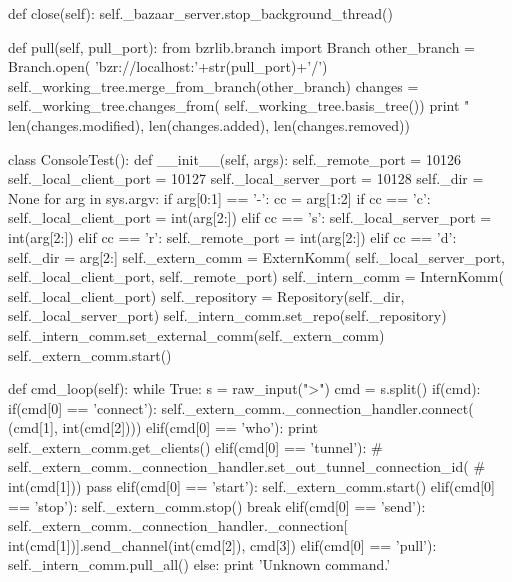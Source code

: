     def close(self):
        self._bazaar_server.stop_background_thread()

    def pull(self, pull_port):
        from bzrlib.branch import Branch
        other_branch = Branch.open(
            'bzr://localhost:'+str(pull_port)+'/')
        self._working_tree.merge_from_branch(other_branch)
        changes = self._working_tree.changes_from(
            self._working_tree.basis_tree())
        print "%
            len(changes.modified), len(changes.added), len(changes.removed))




class ConsoleTest():
    def __init__(self, args):
        self._remote_port       = 10126
        self._local_client_port = 10127
        self._local_server_port = 10128
        self._dir = None
        for arg in sys.argv:
            if arg[0:1] == '-':
                cc = arg[1:2]
                if cc == 'c':
                    self._local_client_port = int(arg[2:])
                elif cc == 's':
                    self._local_server_port = int(arg[2:])
                elif cc == 'r':
                    self._remote_port = int(arg[2:])
                elif cc == 'd':
                    self._dir = arg[2:]
        self._extern_comm = ExternKomm(
            self._local_server_port, self._local_client_port,
            self._remote_port)
        self._intern_comm = InternKomm(
            self._local_client_port)
        self._repository = Repository(self._dir, self._local_server_port)
        self._intern_comm.set_repo(self._repository)
        self._intern_comm.set_external_comm(self._extern_comm)
        self._extern_comm.start()

    def cmd_loop(self):
        while True:
            s = raw_input(">")
            cmd = s.split()
            if(cmd):
                if(cmd[0] == 'connect'):
                    self._extern_comm._connection_handler.connect(
                        (cmd[1], int(cmd[2])))
                elif(cmd[0] == 'who'):
                    print self._extern_comm.get_clients()
                elif(cmd[0] == 'tunnel'):
#                    self._extern_comm._connection_handler.set_out_tunnel_connection_id(
 #                       int(cmd[1]))
                    pass
                elif(cmd[0] == 'start'):
                    self._extern_comm.start()
                elif(cmd[0] == 'stop'):
                    self._extern_comm.stop()
                    break
                elif(cmd[0] == 'send'):
                    self._extern_comm._connection_handler._connection[
                        int(cmd[1])].send_channel(int(cmd[2]), cmd[3])
                elif(cmd[0] == 'pull'):
                    self._intern_comm.pull_all()
                else:
                    print 'Unknown command.'




